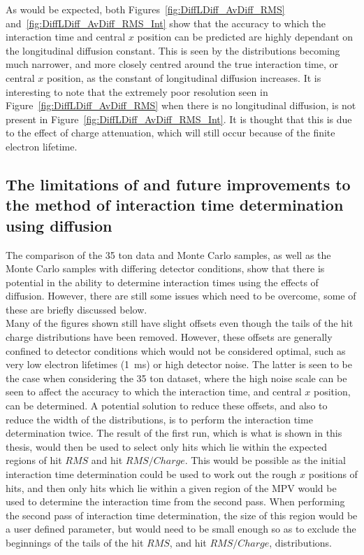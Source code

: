 As would be expected, both Figures~\ref{fig:DiffLDiff_AvDiff_RMS} and~\ref{fig:DiffLDiff_AvDiff_RMS_Int} show that the accuracy to which the interaction time and central $x$ position can be predicted are highly dependant on the longitudinal diffusion constant. This is seen by the distributions becoming much narrower, and more closely centred around the true interaction time, or central $x$ position, as the constant of longitudinal diffusion increases. It is interesting to note that the extremely poor resolution seen in Figure~\ref{fig:DiffLDiff_AvDiff_RMS} when there is no longitudinal diffusion, is not present in Figure~\ref{fig:DiffLDiff_AvDiff_RMS_Int}. It is thought that this is due to the effect of charge attenuation, which will still occur because of the finite electron lifetime. 

\subsection{The limitations of and future improvements to the method of interaction time determination using diffusion} \label{sec:DiffLimitations}
The comparison of the 35 ton data and Monte Carlo samples, as well as the Monte Carlo samples with differing detector conditions, show that there is potential in the ability to determine interaction times using the effects of diffusion. However, there are still some issues which need to be overcome, some of these are briefly discussed below. \\

Many of the figures shown still have slight offsets even though the tails of the hit charge distributions have been removed. However, these offsets are generally confined to detector conditions which would not be considered optimal, such as very low electron lifetimes (1~ms) or high detector noise. The latter is seen to be the case when considering the 35 ton dataset, where the high noise scale can be seen to affect the accuracy to which the interaction time, and central $x$ position, can be determined. A potential solution to reduce these offsets, and also to reduce the width of the distributions, is to perform the interaction time determination twice. The result of the first run, which is what is shown in this thesis, would then be used to select only hits which lie within the expected regions of hit $RMS$ and hit $RMS/Charge$. This would be possible as the initial interaction time determination could be used to work out the rough $x$ positions of hits, and then only hits which lie within a given region of the MPV would be used to determine the interaction time from the second pass. When performing the second pass of interaction time determination, the size of this region would be a user defined parameter, but would need to be small enough so as to exclude the beginnings of the tails of the hit $RMS$, and hit $RMS/Charge$, distributions. \\

